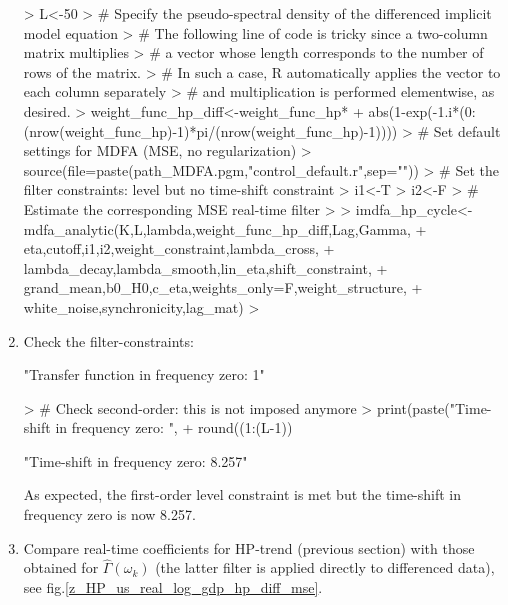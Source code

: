 \documentclass[a4paper]{book}
\begin{document}
\begin{enumerate}
\begin{Schunk}
\begin{Sinput}
> L<-50
> # Specify the pseudo-spectral density of the differenced implicit model equation
> #   The following line of code is tricky since a two-column matrix multiplies
> #   a vector whose length corresponds to the number of rows of the matrix.
> # In such a case, R automatically applies the vector to each column separately
> #   and multiplication is performed elementwise, as desired.
> weight_func_hp_diff<-weight_func_hp*
+   abs(1-exp(-1.i*(0:(nrow(weight_func_hp)-1)*pi/(nrow(weight_func_hp)-1))))
> # Set default settings for MDFA (MSE, no regularization)
> source(file=paste(path_MDFA.pgm,"control_default.r",sep=""))
> # Set the filter constraints: level but no time-shift constraint
> i1<-T
> i2<-F
> # Estimate the corresponding MSE real-time filter
> 
> imdfa_hp_cycle<-mdfa_analytic(K,L,lambda,weight_func_hp_diff,Lag,Gamma,
+                         eta,cutoff,i1,i2,weight_constraint,lambda_cross,
+                         lambda_decay,lambda_smooth,lin_eta,shift_constraint,
+                         grand_mean,b0_H0,c_eta,weights_only=F,weight_structure,
+                         white_noise,synchronicity,lag_mat)
> 
\end{Sinput}
\end{Schunk}
\item Check the filter-constraints:
\begin{Schunk}
\begin{Soutput}
[1] "Transfer function in frequency zero: 1"
\end{Soutput}
\begin{Sinput}
> # Check second-order: this is not imposed anymore
> print(paste("Time-shift in frequency zero: ",
+             round((1:(L-1))%
\end{Sinput}
\begin{Soutput}
[1] "Time-shift in frequency zero: 8.257"
\end{Soutput}
\end{Schunk}
As expected, the first-order level constraint is met but the time-shift in frequency zero is now 8.257. 
\item Compare real-time coefficients for HP-trend (previous section) with those obtained for $\hat{\Gamma}(\omega_k)$ (the latter filter is applied directly to differenced data), see fig.\ref{z_HP_us_real_log_gdp_hp_diff_mse}. 

\end{enumerate}
\end{document}
